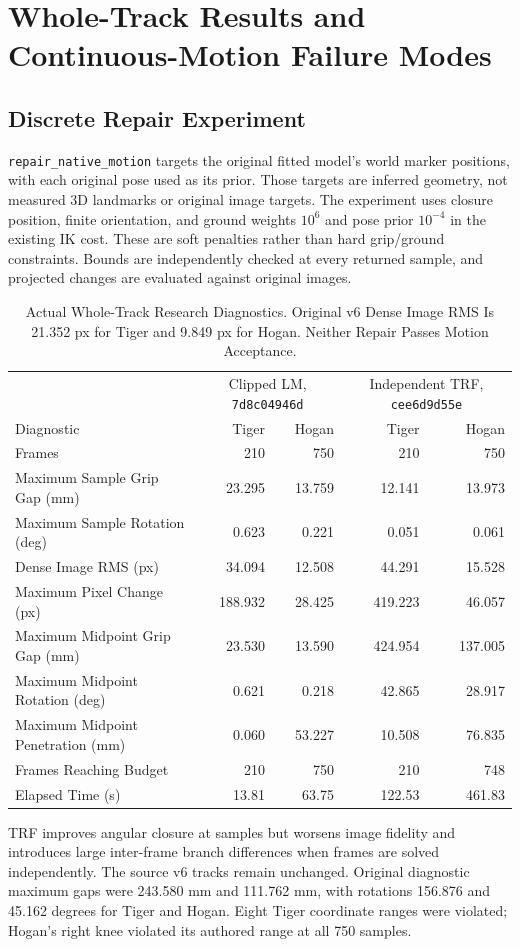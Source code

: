 \documentclass[11pt,letterpaper]{article}
\newcommand{\code}[1]{\nolinkurl{#1}}
\newcommand{\reportsection}[1]{\section{#1}}
\begin{document}
\reportsection{Whole-Track Results and Continuous-Motion Failure Modes}
\subsection{Discrete Repair Experiment}
\code{repair_native_motion} targets the original fitted model's world marker
positions, with each original pose used as its prior. Those targets are inferred
geometry, not measured 3D landmarks or original image targets. The experiment
uses closure position, finite orientation, and ground weights $10^6$ and pose
prior $10^{-4}$ in the existing IK cost. These are soft penalties rather than
hard grip/ground constraints. Bounds are independently checked at every
returned sample, and projected changes are evaluated against original images.

\begin{table}[ht]\centering\small
\begin{tabular}{@{}lrrrr@{}}\toprule
 & \multicolumn{2}{c}{Clipped LM, \code{7d8c04946d}} &
 \multicolumn{2}{c}{Independent TRF, \code{cee6d9d55e}}\\
Diagnostic & Tiger & Hogan & Tiger & Hogan\\\midrule
Frames & 210 & 750 & 210 & 750\\
Maximum Sample Grip Gap (mm) & 23.295 & 13.759 & 12.141 & 13.973\\
Maximum Sample Rotation (deg) & 0.623 & 0.221 & 0.051 & 0.061\\
Dense Image RMS (px) & 34.094 & 12.508 & 44.291 & 15.528\\
Maximum Pixel Change (px) & 188.932 & 28.425 & 419.223 & 46.057\\
Maximum Midpoint Grip Gap (mm) & 23.530 & 13.590 & 424.954 & 137.005\\
Maximum Midpoint Rotation (deg) & 0.621 & 0.218 & 42.865 & 28.917\\
Maximum Midpoint Penetration (mm) & 0.060 & 53.227 & 10.508 & 76.835\\
Frames Reaching Budget & 210 & 750 & 210 & 748\\
Elapsed Time (s) & 13.81 & 63.75 & 122.53 & 461.83\\\bottomrule
\end{tabular}
\caption{Actual Whole-Track Research Diagnostics. Original v6 Dense Image RMS
Is 21.352 px for Tiger and 9.849 px for Hogan. Neither Repair Passes Motion Acceptance.}
\end{table}

TRF improves angular closure at samples but worsens image fidelity and introduces
large inter-frame branch differences when frames are solved independently.
The source v6 tracks remain unchanged. Original diagnostic maximum gaps were
243.580 mm and 111.762 mm, with rotations 156.876 and 45.162 degrees for Tiger
and Hogan. Eight Tiger coordinate ranges were violated; Hogan's right knee
violated its authored range at all 750 samples.
\end{document}
